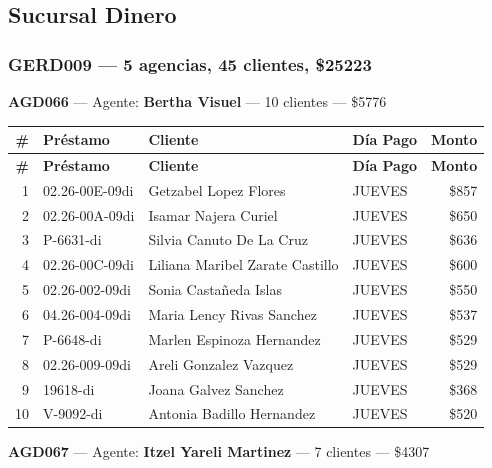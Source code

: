 \documentclass[11pt,a4paper]{article}
\newcommand{\money}[1]{\$\num{#1}}
\begin{document}
\subsection{Sucursal Dinero}

\subsubsection{GERD009 --- 5 agencias, 45 clientes, \money{25223}}

\noindent\textbf{AGD066} --- Agente: \textbf{Bertha Visuel} --- 10 clientes --- \money{5776}


\begin{center}
\renewcommand{\arraystretch}{1.1}
\footnotesize
\begin{longtable}{rlp{6.5cm}lr}
\toprule
\textbf{\#} & \textbf{Pr\'estamo} & \textbf{Cliente} & \textbf{D\'ia Pago} & \textbf{Monto} \\
\midrule
\endfirsthead
\toprule
\textbf{\#} & \textbf{Pr\'estamo} & \textbf{Cliente} & \textbf{D\'ia Pago} & \textbf{Monto} \\
\midrule
\endhead
1 & 02.26-00E-09di & Getzabel Lopez Flores & JUEVES & \money{857} \\
2 & 02.26-00A-09di & Isamar Najera Curiel & JUEVES & \money{650} \\
3 & P-6631-di & Silvia Canuto De La Cruz & JUEVES & \money{636} \\
4 & 02.26-00C-09di & Liliana Maribel Zarate Castillo & JUEVES & \money{600} \\
5 & 02.26-002-09di & Sonia Castañeda Islas & JUEVES & \money{550} \\
6 & 04.26-004-09di & Maria Lency Rivas Sanchez & JUEVES & \money{537} \\
7 & P-6648-di & Marlen Espinoza Hernandez & JUEVES & \money{529} \\
8 & 02.26-009-09di & Areli Gonzalez Vazquez & JUEVES & \money{529} \\
9 & 19618-di & Joana Galvez Sanchez & JUEVES & \money{368} \\
10 & V-9092-di & Antonia Badillo Hernandez & JUEVES & \money{520} \\

\bottomrule
\end{longtable}
\end{center}
\noindent\textbf{AGD067} --- Agente: \textbf{Itzel Yareli Martinez} --- 7 clientes --- \money{4307}
\end{document}
